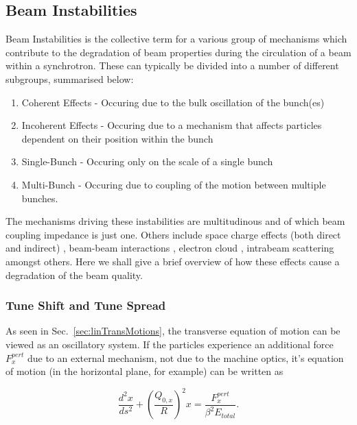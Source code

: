 \subsection{Beam Instabilities}

Beam Instabilities is the collective term for a various group of mechanisms which contribute to the degradation of beam properties during the circulation of a beam within a synchrotron. These can typically be divided into a number of different subgroups, summarised below:

\begin{enumerate}
\item{Coherent Effects - Occuring due to the bulk oscillation of the bunch(es)}
\item{Incoherent Effects - Occuring due to a mechanism that affects particles dependent on their position within the bunch}
\item{Single-Bunch - Occuring only on the scale of a single bunch}
\item{Multi-Bunch - Occuring due to coupling of the motion between multiple bunches}.
\end{enumerate}

The mechanisms driving these instabilities are multitudinous and of which beam coupling impedance is just one. Others include space charge effects (both direct and indirect) \cite{Burov:TransInstabSC, Boine-Frankenheim:InstabSCRings}, beam-beam interactions \cite{Pieloni:PhDThesis}, electron cloud \cite{Li:ECloud}, intrabeam scattering \cite{Schaumann:IBS, Mertens:IBSThesis} amongst others. Here we shall give a brief overview of how these effects cause a degradation of the beam quality.

\subsubsection{Tune Shift and Tune Spread} 

As seen in Sec.~\ref{sec:linTransMotions}, the transverse equation of motion can be viewed as an oscillatory system. If the particles experience an additional force $ F^{pert}_{x}$ due to an external mechanism, not due to the machine optics, it's equation of motion (in the horizontal plane, for example) can be written as

\begin{equation}
\frac{d^{2}x}{ds^{2}} + \left(\frac{Q_{0,x}}{R}\right)^{2} x = \frac{F^{pert}_{x}}{\beta^{2} E_{total}}.
\end{equation}

